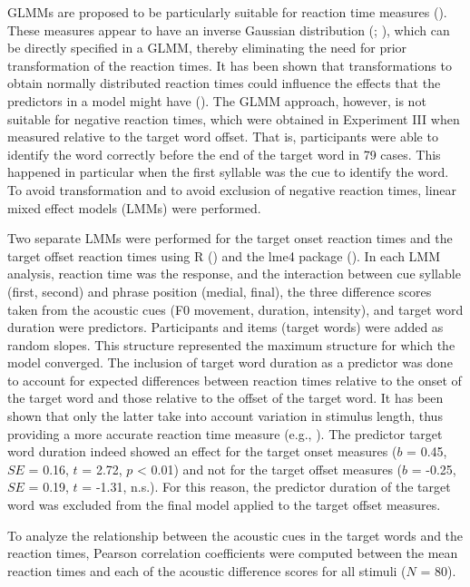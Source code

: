 GLMMs are proposed to be particularly suitable for reaction time measures (\citealt{lo_transform_2015}). These measures appear to have an inverse Gaussian distribution (\citealt{baayen_analyzing_2010}; \citealt{lo_transform_2015}), which can be directly specified in a GLMM, thereby eliminating the need for prior transformation of the reaction times. It has been shown that transformations to obtain normally distributed reaction times could influence the effects that the predictors in a model might have (\citealt{balota_additive_2013}). The GLMM approach, however, is not suitable for negative reaction times, which were obtained in Experiment III when measured relative to the target word offset. That is, participants were able to identify the word correctly before the end of the target word in 79 cases. This happened in particular when the first syllable was the cue to identify the word. To avoid transformation and to avoid exclusion of negative reaction times, linear mixed effect models (LMMs) were performed.

Two separate LMMs were performed for the target onset reaction times and the target offset reaction times using R (\citealt{rcoreteam_project_2019}) and the lme4 package (\citealt{bates_fitting_2015}). In each LMM analysis, reaction time was the response, and the interaction between cue syllable (first, second) and phrase position (medial, final), the three difference scores taken from the acoustic cues (F0 movement, duration, intensity), and target word duration were predictors. Participants and items (target words) were added as random slopes. This structure represented the maximum structure for which the model converged. The inclusion of target word duration as a predictor was done to account for expected differences between reaction times relative to the onset of the target word and those relative to the offset of the target word. It has been shown that only the latter take into account variation in stimulus length, thus providing a more accurate reaction time measure (e.g., \citealt{lipinski_does_2005}). The predictor target word duration indeed showed an effect for the target onset measures ($b$ = 0.45, $SE$ = 0.16, $t$ = 2.72, $p$ < 0.01) and not for the target offset measures ($b$ = -0.25, $SE$ = 0.19, $t$ = -1.31, n.s.). For this reason, the predictor duration of the target word was excluded from the final model applied to the target offset measures.

To analyze the relationship between the acoustic cues in the target words and the reaction times, Pearson correlation coefficients were computed between the mean reaction times and each of the acoustic difference scores for all stimuli ($N$ = 80).

